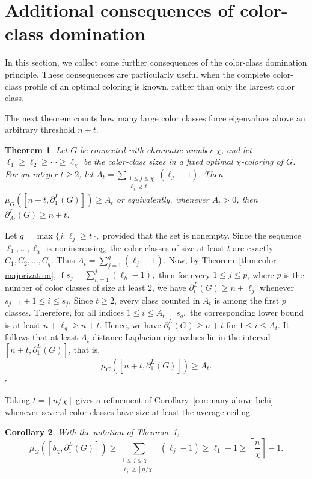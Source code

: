 \documentclass[12pt]{article}
\newcommand{\ceil}[1]{\left\lceil #1 \right\rceil}
\theoremstyle{plain}
\newtheorem{theorem}{Theorem}[section]
\newtheorem{corollary}[theorem]{Corollary}
\theoremstyle{definition}
\renewenvironment{proof}{{\noindent\bfseries Proof. }}{\hfill$\square$\par}
\begin{document}
\section{Additional consequences of color-class domination}\label{section-new}

In this section, we collect some further consequences of the color-class domination principle. These consequences are particularly useful when the complete color-class profile of an optimal coloring is known, rather than only the largest color class.

\medskip
\noindent The next theorem counts how many large color classes force eigenvalues above an arbitrary threshold $n+t$.
\begin{theorem}\label{thm:multi-threshold}
	Let $G$ be connected with chromatic number $\chi$, and let
	$\ell_1\ge\ell_2\ge\cdots\ge\ell_\chi$ be the color-class sizes in a fixed optimal $\chi$-coloring of $G$. For an integer $t\ge2$, let
	$A_t=\sum_{\substack{1\le j\le\chi\\ \ell_j\ge t}}(\ell_j-1).$ 
	Then $\mu_G([n+t,\partial^{L}_1(G)])\ge A_t$ or equivalently, whenever $A_t>0$, then
	 $\partial^{L}_{A_t}(G)\ge n+t.$ 
\end{theorem}

\begin{proof}
	Let $q=\max\{j:\ell_j\ge t\},$ provided that the set is nonempty. Since the sequence
	$\ell_1,\dots,\ell_\chi$ is nonincreasing, the color classes of size at least
	$t$ are exactly $C_1,C_2,\dots,C_q.$ Thus $A_t=\sum_{j=1}^{q}(\ell_j-1).$ Now, by Theorem~\ref{thm:color-majorization}, if
 	$s_j=\sum_{h=1}^{j}(\ell_h-1),$ then for every $1\le j\le p$, where $p$ is the number of color classes of size at least $2$, we have
	 $\partial_i^{L}(G)\ge n+\ell_j$  whenever $ s_{j-1}+1\le i\le s_j.$ Since $t\ge2$, every class counted in $A_t$ is among the first $p$ classes. Therefore, for all indices $1\le i\le A_t=s_q,$ the corresponding lower bound is at least
	 $n+\ell_q\ge n+t.$ 
	Hence, we have  $\partial_i^{L}(G)\ge n+t$ for  $1\le i\le A_t.$ It follows that at least $A_t$ distance Laplacian eigenvalues lie in the interval $[n+t,\partial^{L}_1(G)]$, that is,
	\[
	\mu_G([n+t,\partial^{L}_1(G)])\ge A_t.
	\]
\end{proof}

\noindent Taking $t=\ceil{n/\chi}$ gives a refinement of Corollary~\ref{cor:many-above-bchi} whenever several color classes have size at least the average ceiling.

\begin{corollary} \label{cor:refined-threshold-count}
	With the notation of Theorem~\ref{thm:multi-threshold},
	\[
	\mu_G([b_\chi,\partial^{L}_1(G)])
	\ge
	\sum_{\substack{1\le j\le\chi\\ \ell_j\ge \ceil{n/\chi}}}(\ell_j-1)
	\ge
	\ell_1-1
	\ge
	\ceil{\frac{n}{\chi}}-1.
	\]
\end{corollary}
\end{document}
